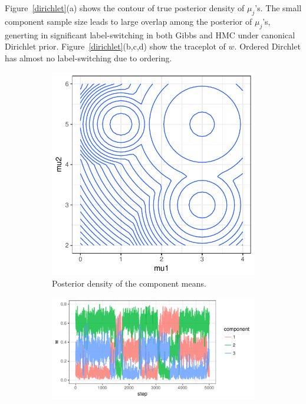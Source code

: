 \documentclass[10pt]{article}
\DeclareMathOperator{\1}{\mathbbm{1}}
\begin{document}
Figure~\ref{dirichlet}(a) shows the contour of true posterior density of $\mu_j$'s. The small component sample size leads to large overlap among the posterior of $\mu_j$'s, generting in significant label-switching in both Gibbs and HMC under canonical Dirichlet prior. Figure~\ref{dirichlet}(b,c,d) show the traceplot of $w$. Ordered Dirchlet has almost no label-switching due to ordering.


\begin{figure}[H]
\begin{center}
   \begin{subfigure}[b]{0.3\textwidth}
    \includegraphics[width=1\textwidth]{fmm_mu_contour.pdf}
    \caption{Posterior density of the component means.}
    \end{subfigure}
    \end{center}
    \centering
   \begin{subfigure}[b]{0.32\textwidth}
    \includegraphics[width=1\textwidth]{fmm_w_gibbs.pdf}

\end{subfigure}
\end{figure}
\end{document}
